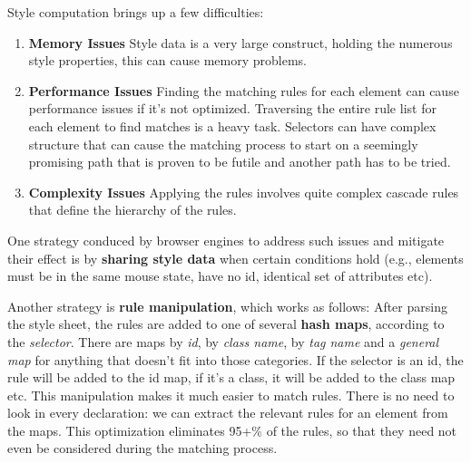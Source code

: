 \documentclass[a4paper, justified, notoc]{tufte-handout} %
\begin{document}
Style computation brings up a few difficulties:
\begin{enumerate}
	\item \textbf{Memory Issues} \newline Style data is a very large construct, holding the numerous style properties, this can cause memory problems.
	\item \textbf{Performance Issues} \newline Finding the matching rules for each element can cause performance issues if it's not optimized. Traversing the entire rule list for each element to find matches is a heavy task. Selectors can have complex structure that can cause the matching process to start on a seemingly promising path that is proven to be futile and another path has to be tried.
%
	\item \textbf{Complexity Issues} \newline Applying the rules involves quite complex cascade rules that define the hierarchy of the rules.
\end{enumerate}

One strategy conduced by browser engines to address such issues and mitigate their effect is by \textbf{sharing style data} when certain conditions hold (e.g., elements must be in the same mouse state, have no id, identical set of attributes etc). 

Another strategy is \textbf{rule manipulation}, which works as follows:
After parsing the style sheet, the rules are added to one of several \textbf{hash maps}, according to the \emph{selector}. There are maps by \emph{id}, by \emph{class name}, by \emph{tag name} and a \emph{general map} for anything that doesn't fit into those categories. If the selector is an id, the rule will be added to the id map, if it's a class, it will be added to the class map etc. 
This manipulation makes it much easier to match rules. There is no need to look in every declaration: we can extract the relevant rules for an element from the maps. This optimization eliminates 95+\% of the rules, so that they need not even be considered during the matching process.
\end{document}
